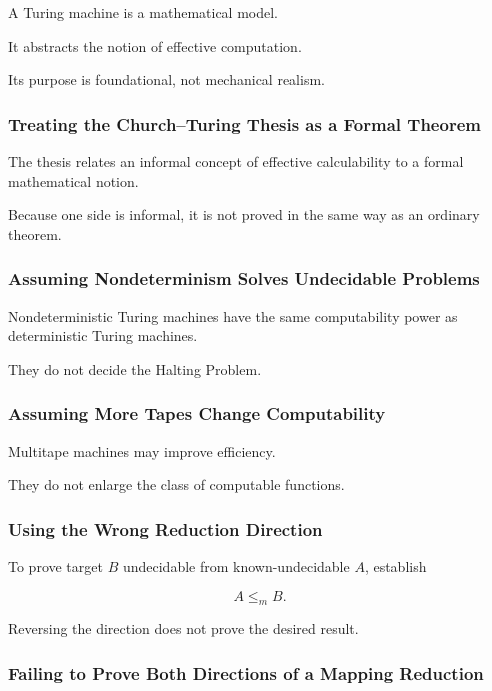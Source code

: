 A Turing machine is a mathematical model.

It abstracts the notion of effective computation.

Its purpose is foundational, not mechanical realism.

\subsubsection{Treating the Church--Turing Thesis as a Formal Theorem}

The thesis relates an informal concept of effective calculability to a
formal mathematical notion.

Because one side is informal, it is not proved in the same way as an
ordinary theorem.

\subsubsection{Assuming Nondeterminism Solves Undecidable Problems}

Nondeterministic Turing machines have the same computability power as
deterministic Turing machines.

They do not decide the Halting Problem.

\subsubsection{Assuming More Tapes Change Computability}

Multitape machines may improve efficiency.

They do not enlarge the class of computable functions.

\subsubsection{Using the Wrong Reduction Direction}

To prove target \(B\) undecidable from known-undecidable \(A\), establish

\[
\boxed{
A\leq_mB.
}
\]

Reversing the direction does not prove the desired result.

\subsubsection{Failing to Prove Both Directions of a Mapping Reduction}


